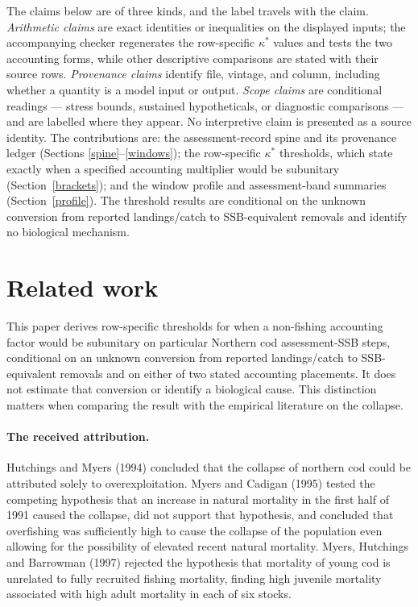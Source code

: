 \documentclass[10pt,twocolumn]{article}
\theoremstyle{plain}
\theoremstyle{remark}
\begin{document}
The claims below are of three kinds, and the label travels with the
claim. \emph{Arithmetic claims} are exact identities or inequalities on
the displayed inputs; the accompanying checker regenerates the
row-specific \(\kappa^*\) values and tests the two accounting forms,
while other descriptive comparisons are stated with their source rows.
\emph{Provenance claims} identify file, vintage, and column, including
whether a quantity is a model input or output. \emph{Scope claims} are
conditional readings --- stress bounds, sustained hypotheticals, or
diagnostic comparisons --- and are labelled where they appear. No
interpretive claim is presented as a source identity. The contributions
are: the assessment-record spine and its provenance ledger (Sections
\ref{spine}--\ref{windows}); the row-specific \(\kappa^*\) thresholds,
which state exactly when a specified accounting multiplier would be
subunitary (Section~\ref{brackets}); and the window profile and
assessment-band summaries (Section~\ref{profile}). The threshold
results are conditional on the unknown conversion from reported
landings/catch to SSB-equivalent removals and identify no biological
mechanism.

\section{Related work}
\label{priorart}

This paper derives row-specific thresholds for when a non-fishing
accounting factor would be subunitary on particular Northern cod
assessment-SSB steps, conditional on an unknown conversion from reported
landings/catch to SSB-equivalent removals and on either of two stated
accounting placements. It does not estimate that conversion or identify
a biological cause. This distinction matters when comparing the result
with the empirical literature on the collapse.

\paragraph{The received attribution.} Hutchings and Myers (1994) concluded that the collapse
of northern cod could be attributed solely to overexploitation. Myers and Cadigan (1995)
tested the competing hypothesis that an increase in natural mortality in the first half of
1991 caused the collapse, did not support that hypothesis, and concluded that overfishing was
sufficiently high to cause the collapse of the population even allowing for the possibility
of elevated recent natural mortality. Myers, Hutchings and Barrowman (1997) rejected the
hypothesis that mortality of young cod is unrelated to fully recruited fishing mortality,
finding high juvenile mortality associated with high adult mortality in each of six stocks.
\end{document}
